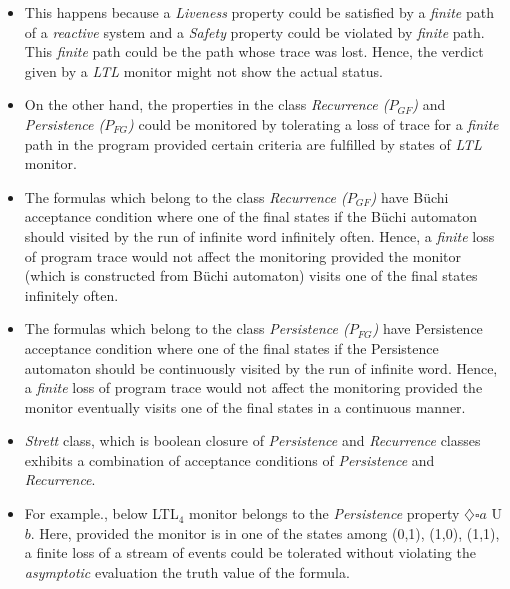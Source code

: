\documentclass[]{article}
\begin{document}
\begin{itemize}
			\item This happens because a \emph{Liveness} property could be satisfied by a \emph{finite} path of a \emph{reactive} system and a \emph{Safety} property could be violated by \emph{finite} path. This \emph{finite} path could be the path whose trace was lost. Hence, the verdict given by a \emph{LTL} monitor might not show the actual status.
			
			\item On the other hand, the properties in the class \emph{Recurrence ($P_{GF}$)} and \emph{Persistence ($P_{FG}$)} could be monitored by tolerating a loss of trace for a \emph{finite} path in the program provided certain criteria are fulfilled by states of \emph{LTL} monitor.
			
			\item The formulas which belong to the class \emph{Recurrence ($P_{GF}$)} have B\"{u}chi acceptance condition where one of the final states if the B\"{u}chi automaton should visited by the run of infinite word infinitely often. Hence, a \emph{finite} loss of program trace would not affect the monitoring provided the monitor (which is constructed from B\"{u}chi automaton) visits one of the final states infinitely often.
			
			\item The formulas which belong to the class \emph{Persistence ($P_{FG}$)} have Persistence acceptance condition where one of the final states if the Persistence automaton should be continuously visited by the run of infinite word. Hence, a \emph{finite} loss of program trace would not affect the monitoring provided the monitor eventually visits one of the final states in a continuous manner.
			
			\item \emph{Strett} class, which is boolean closure of \emph{Persistence} and \emph{Recurrence} classes exhibits a combination of acceptance conditions of \emph{Persistence} and \emph{Recurrence}. 	
			
			\item For example., below LTL$_4$ monitor belongs to the \emph{Persistence} property $\diamondsuit \square a$ U $b$. Here, provided the monitor is in one of the states among (0,1), (1,0), (1,1), a finite loss of a stream of events could be tolerated without violating the \emph{asymptotic} evaluation the truth value of the formula. 
			

\end{itemize}
\end{document}
